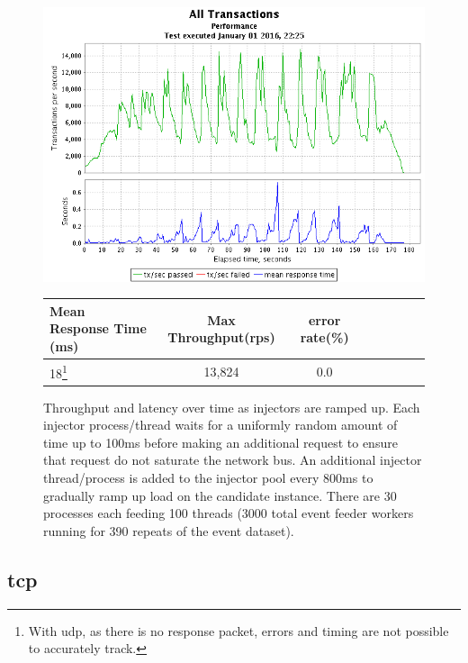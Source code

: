 \documentclass[a4paper,11pt]{scrreprt}
\makeatletter
\newcommand\footnoteref[1]{\protected@xdef\@thefnmark{\ref{#1}}\@footnotemark}
\makeatother
\begin{document}
\begin{figure}[h!]
\centering
\caption{Throughput and latency over time as injectors are ramped up. Each injector process/thread waits for a uniformly random amount of time up to 100ms before making an additional request to ensure that request do not saturate the network bus. An additional injector thread/process is added to the injector pool every 800ms to gradually ramp up load on the candidate instance. There are 30 processes each feeding 100 threads (3000 total event feeder workers running for 390 repeats of the event dataset).}
\includegraphics[scale=0.6, trim=0 -25 0 2, clip=true] {UDP_throughput.png}
\label{fig:udpthroughput}
\begin{tabular}{l*{6}{c}r}
Mean Response Time (ms) & Max Throughput(\acrshort{rps}) & error rate(\%)\\
\hline
18\footnote{\label{UDP_errors}With \acrshort{udp}, as there is no response packet, errors and timing are not possible to accurately track.} & 13,824 & 0.0\footnoteref{UDP_errors}
\end{tabular}
\end{figure}
\clearpage

\subsection{\acrshort{tcp}}
\end{document}
